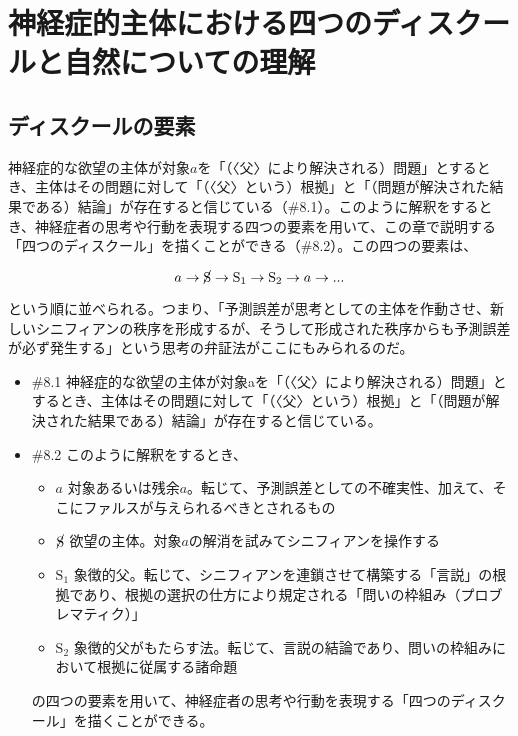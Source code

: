\section{神経症的主体における四つのディスクールと自然についての理解}\label{ux795eux7d4cux75c7ux7684ux4e3bux4f53ux306bux304aux3051ux308bux56dbux3064ux306eux30c7ux30a3ux30b9ux30afux30fcux30ebux3068ux81eaux7136ux306bux3064ux3044ux3066ux306eux7406ux89e3}

\subsection{ディスクールの要素}\label{ux30c7ux30a3ux30b9ux30afux30fcux30ebux306eux8981ux7d20}

神経症的な欲望の主体が対象\(a\)を「（〈父〉により解決される）問題」とするとき、主体はその問題に対して「（〈父〉という）根拠」と「（問題が解決された結果である）結論」が存在すると信じている（\#8.1）。このように解釈をするとき、神経症者の思考や行動を表現する四つの要素を用いて、この章で説明する「四つのディスクール」を描くことができる（\#8.2）。この四つの要素は、

\[a \rightarrow \cancel{\textrm{S}} \rightarrow \textrm{S}_1 \rightarrow \textrm{S}_2 \rightarrow a \rightarrow ...\]

という順に並べられる。つまり、「\mbox{予測誤差}が思考としての主体を作動させ、新しいシニフィアンの秩序を形成するが、そうして形成された秩序からも\mbox{予測誤差}が必ず発生する」という思考の\mbox{弁証法}がここにもみられるのだ。

\begin{note}{}
  \begin{itemize}
    \tightlist
    \item{\#8.1}
      神経症的な欲望の主体が対象aを「（〈父〉により解決される）問題」とするとき、主体はその問題に対して「（〈父〉という）根拠」と「（問題が解決された結果である）結論」が存在すると信じている。
    \item{\#8.2}
      このように解釈をするとき、
      \begin{itemize}
          \tightlist
          \item{$a$}
          対象あるいは残余$a$。転じて、\mbox{予測誤差}としての不確実性、加えて、そこにファルスが与えられるべきとされるもの
          \item{$\cancel{\textrm{S}}$}
          欲望の主体。対象$a$の解消を試みてシニフィアンを操作する
          \item{$\textrm{S}_1$}
          象徴的父。転じて、シニフィアンを連鎖させて構築する「言説」の根拠であり、根拠の選択の仕方により規定される「問いの枠組み（プロブレマティク）」
          \item{$\textrm{S}_2$}
          象徴的父がもたらす法。転じて、言説の結論であり、問いの枠組みにおいて根拠に従属する諸命題
        \end{itemize}
    の四つの要素を用いて、神経症者の思考や行動を表現する「四つのディスクール」を描くことができる。
  \end{itemize}
\end{note}

